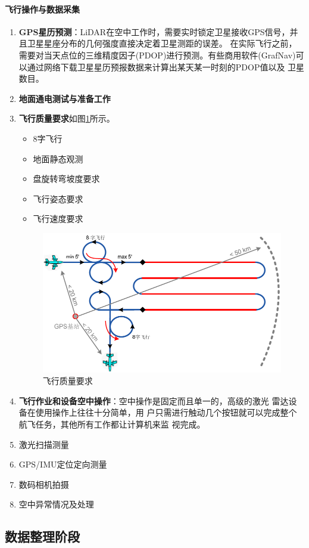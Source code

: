 \paragraph{飞行操作与数据采集}
\begin{enumerate}
	\item \textbf{GPS星历预测}：LiDAR在空中工作时，需要实时锁定卫星接收GPS信号，并且卫星星座分布的几何强度直接决定着卫星测距的误差。
		在实际飞行之前，需要对当天点位的三维精度因子(PDOP)进行预测。有些商用软件(GrafNav)可以通过网络下载卫星星历预报数据来计算出某天某一时刻的PDOP值以及 卫星数目。
	\item \textbf{地面通电测试与准备工作}
	\item \textbf{飞行质量要求}如图\ref{fig:飞行质量要求}所示。
		\begin{itemize}
			\item 8字飞行
			\item 地面静态观测
			\item 盘旋转弯坡度要求
			\item 飞行姿态要求
			\item 飞行速度要求
		\end{itemize}
		\begin{figure}[htbp]
			 \centering
			 \includegraphics[width=0.7\linewidth]{figure/Chapter5/飞行质量要求}
			 \caption{飞行质量要求}
			 \label{fig:飞行质量要求}
		\end{figure}
	\item \textbf{飞行作业和设备空中操作}：空中操作是固定而且单一的，高级的激光
		雷达设备在使用操作上往往十分简单，用
		户只需进行触动几个按钮就可以完成整个
		航飞任务，其他所有工作都让计算机来监
		视完成。
	\item 激光扫描测量
	\item GPS/IMU定位定向测量
	\item 数码相机拍摄
	\item 空中异常情况及处理
\end{enumerate}

\subsection{数据整理阶段}
